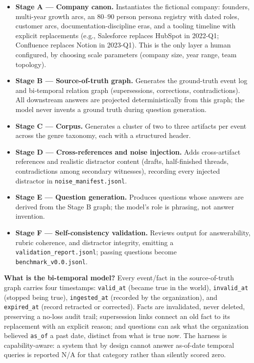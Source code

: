 \begin{itemize}
  \item \textbf{Stage A --- Company canon.} Instantiates the fictional company:
    founders, multi-year growth arcs, an $80$--$90$ person persona registry with
    dated roles, customer arcs, documentation-discipline eras, and a tooling
    timeline with explicit replacements (e.g., Salesforce replaces HubSpot in
    2022-Q1; Confluence replaces Notion in 2023-Q1). This is the only layer a
    human configured, by choosing scale parameters (company size, year range,
    team topology).
  \item \textbf{Stage B --- Source-of-truth graph.} Generates the ground-truth
    event log and bi-temporal relation graph (supersessions, corrections,
    contradictions). All downstream answers are projected deterministically from
    this graph; the model never invents a ground truth during question
    generation.
  \item \textbf{Stage C --- Corpus.} Generates a cluster of two to three
    artifacts per event across the genre taxonomy, each with a structured header.
  \item \textbf{Stage D --- Cross-references and noise injection.} Adds
    cross-artifact references and realistic distractor content (drafts,
    half-finished threads, contradictions among secondary witnesses), recording
    every injected distractor in \texttt{noise\_manifest.jsonl}.
  \item \textbf{Stage E --- Question generation.} Produces questions whose
    answers are derived from the Stage B graph; the model's role is phrasing,
    not answer invention.
  \item \textbf{Stage F --- Self-consistency validation.} Reviews output for
    answerability, rubric coherence, and distractor integrity, emitting a
    \texttt{validation\_report.jsonl}; passing questions become
    \texttt{benchmark\_v0.0.jsonl}.
\end{itemize}

\textbf{What is the bi-temporal model?}
Every event/fact in the source-of-truth graph carries four timestamps:
\texttt{valid\_at} (became true in the world), \texttt{invalid\_at} (stopped
being true), \texttt{ingested\_at} (recorded by the organization), and
\texttt{expired\_at} (record retracted or corrected). Facts are invalidated,
never deleted, preserving a no-loss audit trail; supersession links connect an
old fact to its replacement with an explicit reason; and questions can ask what
the organization believed \texttt{as\_of} a past date, distinct from what is
true now. The harness is capability-aware: a system that by design cannot answer
as-of-date temporal queries is reported N/A for that category rather than
silently scored zero.

